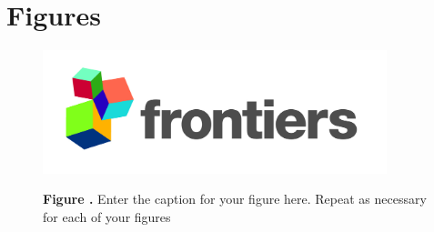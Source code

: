 \documentclass{frontiersSCNS} %
\begin{document}



\section*{Figures}


\begin{figure}[h!]
\begin{center}
\includegraphics[width=10cm]{logo1}%
\end{center}
 \textbf{\label{fig:01} Figure .}{ Enter the caption for your figure here.  Repeat as  necessary for each of your figures }
\end{figure}




\end{document}
